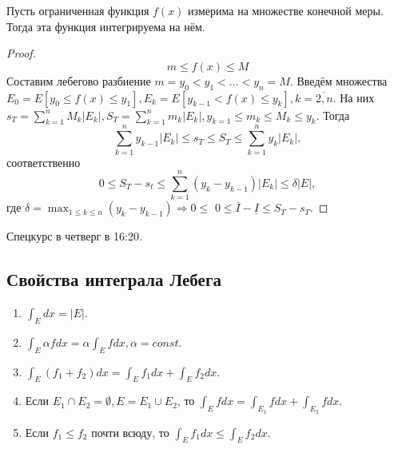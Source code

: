 \documentclass[11pt]{article}
\newcounter{th}\setcounter{th}{0}
\def\th{\par\smallskip\refstepcounter{th}\textbf{\arabic{th}}}
\newtheorem*{Theorem}{Теорема \th}
\begin{document}
\begin{Theorem}
Пусть ограниченная функция $f(x)$ измерима на множестве конечной меры. Тогда эта функция
интегрируема на нём.
\end{Theorem}
\begin{proof}
\begin{equation}
m \leq f(x) \leq M
\end{equation}
Составим лебегово разбиение $m = y_0 < y_1 < \ldots < y_n = M$. Введём множества
$E_0 = E[y_0 \leq f(x) \leq y_1], E_k = E[y_{k - 1} < f(x) \leq y_k], k = \overline{2, n}$.
На них $s_T = \sum_{k = 1}^nM_k|E_k|, S_T = \sum_{k = 1}^nm_k|E_k|, y_{k = 1} \leq m_k \leq M_k \leq y_k$.
Тогда
\begin{equation}
\sum_{k = 1}^ny_{k - 1}|E_k| \leq s_T \leq S_T \leq \sum_{k = 1}^ny_k|E_k|,
\end{equation}
соответственно
\begin{equation}
0 \leq S_T - s_t \leq \sum_{k = 1}^n(y_k - y_{k - 1})|E_k| \leq \delta|E|,
\end{equation}
где $\delta = \max_{1 \leq k \leq n}(y_k - y_{k - 1}) \Rightarrow 0 \leq$
$0 \leq \overline{I} - \underline{I} \leq S_T - s_T$.
\end{proof}
Спецкурс в четверг в 16:20.
\subsection{Свойства интеграла Лебега}
\label{sec:org74ba3ae}
\begin{enumerate}
\item \(\int_Edx = |E|\).
\item \(\int_E\alpha fdx = \alpha\int_Efdx, \alpha = const\).
\item \(\int_E(f_1 + f_2)dx = \int_Ef_1dx + \int_Ef_2dx\).
\item Если \(E_1 \cap E_2 = \emptyset, E = E_1 \cup E_2\), то \(\int_Efdx = \int_{E_1}fdx + \int_{E_2}fdx\).
\item Если \(f_1 \leq f_2\) почти всюду, то \(\int_Ef_1dx \leq \int_Ef_2dx\).
\end{enumerate}
\end{document}

